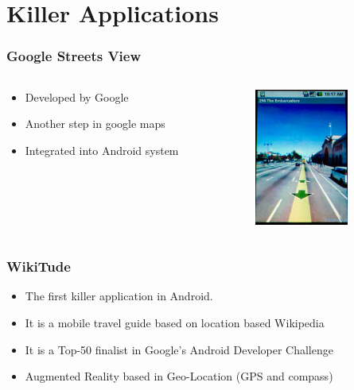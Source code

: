 \documentclass{beamer}
\begin{document}
\section{Killer Applications}

\begin{frame}
\frametitle{Google Streets View}

\begin{columns}

\begin{column}{0.6\textwidth}
\begin{itemize}
\item Developed by Google
\item Another step in google maps
\item Integrated into Android system
\end{itemize}

\begin{center}
\end{center}
\end{column}

\begin{column}{0.4\textwidth}
\begin{center}
  \includegraphics[height=4.5cm]{figs/googleStreetsView.jpg}
\end{center}

\end{column}
\end{columns}

\end{frame}

\begin{frame}
\frametitle{WikiTude}

\begin{itemize} 
\item The first killer application in Android.
\item It is a mobile travel guide based on location based Wikipedia
\item It is a Top-50 finalist in Google's Android Developer Challenge
\item Augmented Reality based in Geo-Location (GPS and compass)
\end{itemize}

\begin{center}
\end{center}

\end{frame}
\end{document}
